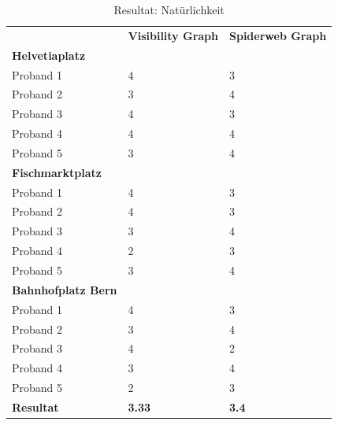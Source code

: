 \begin{table}[ht]
    \centering
    \caption{Resultat: Natürlichkeit}
    \label{table:Resultat Natürlichkeit}
    \begin{tabular}{lll}
        & \textbf{Visibility Graph} & \textbf{Spiderweb Graph} \\
        \textbf{Helvetiaplatz}   &                          &                          \\
        Proband 1                & 4                        & 3                        \\
        Proband 2                & 3                        & 4                        \\
        Proband 3                & 4                        & 3                        \\
        Proband 4                & 4                        & 4                        \\
        Proband 5                & 3                        & 4                        \\
        \textbf{Fischmarktplatz} &                          &                          \\
        Proband 1                & 4                        & 3                        \\
        Proband 2                & 4                        & 3                        \\
        Proband 3                & 3                        & 4                        \\
        Proband 4                & 2                        & 3                        \\
        Proband 5                & 3                        & 4                        \\
        \textbf{Bahnhofplatz Bern} &                        &                          \\
        Proband 1                & 4                        & 3                        \\
        Proband 2                & 3                        & 4                        \\
        Proband 3                & 4                        & 2                        \\
        Proband 4                & 3                        & 4                        \\
        Proband 5                & 2                        & 3                        \\
        \textbf{Resultat}        & \textbf{3.33}               & \textbf{3.4}                       
    \end{tabular}
\end{table}

